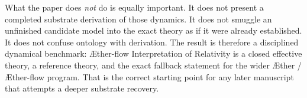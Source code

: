 \documentclass[11pt]{article}
\newcommand{\Aether}{\AE{}ther}
\newcommand{\Aflow}{\AE{}ther-flow}
\newcommand{\TheoryName}{\Aflow{} Interpretation of Relativity}
\begin{document}
What the paper does \emph{not} do is equally important. It does not present a completed substrate derivation of those dynamics. It does not smuggle an unfinished candidate model into the exact theory as if it were already established. It does not confuse ontology with derivation. The result is therefore a disciplined dynamical benchmark: \TheoryName{} is a closed effective theory, a reference theory, and the exact fallback statement for the wider \Aether{} / \Aflow{} program. That is the correct starting point for any later manuscript that attempts a deeper substrate recovery.
\end{document}
